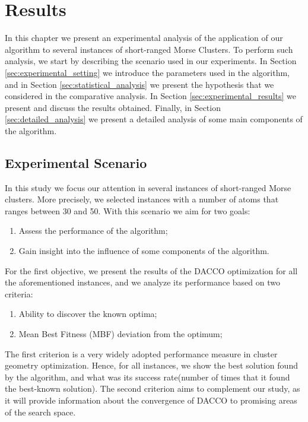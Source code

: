 \chapter{Results}
\label{chap:results}

In this chapter we present an experimental analysis of the application of our algorithm to several instances of short-ranged Morse Clusters. To perform such analysis, we start by describing the scenario used in our experiments. In Section \ref{sec:experimental_setting} we introduce the parameters used in the algorithm, and in Section \ref{sec:statistical_analysis} we present the hypothesis that we considered in the comparative analysis. In Section \ref{sec:experimental_results} we present and discuss the results obtained. Finally, in Section \ref{sec:detailed_analysis} we present a detailed analysis of some main components of the algorithm.




\section{Experimental Scenario}
\label{sec:experimental_scenario}
In this study we focus our attention in several instances of short-ranged Morse clusters. More precisely, we selected instances with a number of atoms that ranges between 30 and 50. With this scenario we aim for two goals: 
	\begin{enumerate}
		\item Assess the performance of the algorithm;
		\item Gain insight into the influence of some components of the algorithm. 
	\end{enumerate}
	
	For the first objective, we present the results of the DACCO optimization for all the aforementioned instances, and we analyze its performance based on two criteria:
	\begin{enumerate}
		\item Ability to discover the known optima;
		\item Mean Best Fitness (MBF) deviation from the optimum;
	\end{enumerate}
	
	The first criterion is a very widely adopted performance measure in cluster geometry optimization. Hence, for all instances, we show the best solution found by the algorithm, and what was its success rate(number of times that it found the best-known solution).
	The second criterion aims to complement our study, as it will provide information about the convergence of DACCO to promising areas of the search space.
	
